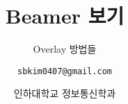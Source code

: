 \documentclass{beamer}
\title{Beamer 보기}
\subtitle{Overlay 방법들}
\author[Cheng-Bin Jin]{\texttt{sbkim0407@gmail.com}}
\date[\today]{인하대학교 정보통신학과}
\institute{컴퓨터비젼 연구실}
\begin{document}
\begin{frame}
\titlepage
\end{frame}
\end{document}

